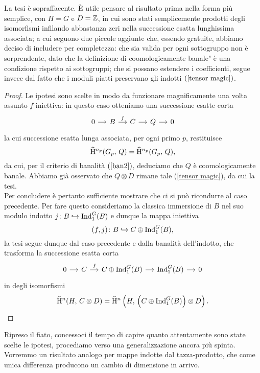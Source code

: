 La tesi è sopraffacente. È utile pensare al risultato prima nella forma più semplice, con $ H=G $ e $ D = \mathbb{Z} $, in cui sono stati semplicemente prodotti degli isomorfismi infilando abbastanza zeri nella successione esatta lunghissima associata; a cui seguono due piccole aggiunte che, essendo gratuite, abbiamo deciso di includere per completezza: che sia valida per ogni sottogruppo non è sorprendente, dato che la definizione di \leftquote coomologicamente banale" è una condizione rispetto ai sottogruppi; che si possano estendere i coefficienti, segue invece dal fatto che i moduli piatti preservano gli indotti $ (\ref{tensor magic}) $. 

\begin{proof}
	Le ipotesi sono scelte in modo da funzionare magnificamente una volta assunto $ f $ iniettiva: in questo caso otteniamo una successione esatte corta
	\[ \begin{tikzcd}[column sep = small]
	0 \rar
	& B \rar["f"]
	& C \rar
	& Q \rar
	& 0 \end{tikzcd} \]
	la cui successione esatta lunga associata, per ogni primo $ p $, restituisce
	\[ \operatorname{\widehat{H}^{\mathnormal{n_p}}}(G_p, \, Q) = \operatorname{\widehat{H}^{\mathnormal{n_p}}}(G_p, \, Q), \]
	da cui, per il criterio di banalità $ (\ref{ban2}) $, deduciamo che $ Q $ è coomologicamente banale. Abbiamo già osservato che $ Q \otimes D $ rimane tale (\ref{tensor magic}), da cui la tesi. \\
	
	Per concludere è pertanto sufficiente mostrare che  ci si può ricondurre al caso precedente. Per fare questo consideriamo la classica immersione di $ B $ nel suo modulo indotto $ j \colon B \hookrightarrow \operatorname{Ind}_1^G(B) $ e dunque la mappa iniettiva
	\[ (f, j)\colon B \hookrightarrow C \oplus \operatorname{Ind}_1^G(B), \]
	la tesi segue dunque dal caso precedente e dalla banalità dell'indotto, che trasforma la successione esatta corta
	\[ \begin{tikzcd}[column sep = small]
	0 \rar
	& C \rar["f"]
	& C \oplus \Ind_1^G(B) \rar
	& \Ind_1^G(B) \rar
	& 0 \end{tikzcd} \]
	in degli isomorfismi
	\[ \operatorname{\widehat{H}^{\mathnormal{n}}}(H, \, C \otimes D ) = \operatorname{\widehat{H}^{\mathnormal{n}}} \left(H, \, \left(C \oplus \operatorname{Ind}_1^G(B)\right) \otimes D \right). \]
\end{proof}

Ripreso il fiato, concessoci il tempo di capire quanto attentamente sono state scelte le ipotesi, procediamo verso una generalizzazione ancora più spinta. Vorremmo un risultato analogo per mappe indotte dal tazza-prodotto, che come unica differenza producono un cambio di dimensione in arrivo.

